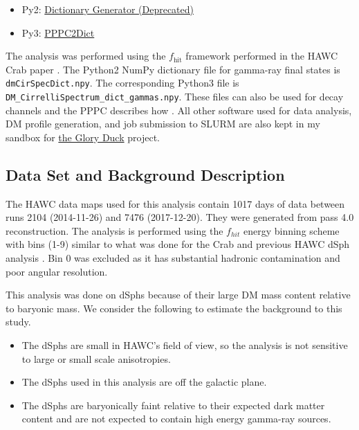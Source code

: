 \begin{itemize}
    \item Py2: \href{https://gitlab.com/hawc-observatory/sandboxes/salaza82/glory-duck-hawc/-/tree/master/GD_spectrum}{Dictionary Generator (Deprecated)}
    \item Py3: \href{https://gitlab.com/hawc-observatory/sandboxes/salaza82/pppc2dict}{PPPC2Dict}
\end{itemize}

The analysis was performed using the $f_{\textrm{hit}}$ framework performed in the HAWC Crab paper \cite{Abeysekara_2017}.
The Python2 NumPy dictionary file for gamma-ray final states is \texttt{dmCirSpecDict.npy}.
The corresponding Python3 file is \texttt{DM\_CirrelliSpectrum\_dict\_gammas.npy}.
These files can also be used for decay channels and the PPPC describes how \cite{Cirelli_2011}.
All other software used for data analysis, DM profile generation, and job submission to SLURM are also kept in my sandbox for \href{https://gitlab.com/hawc-observatory/sandboxes/salaza82/glory-duck-hawc}{the Glory Duck} project.

\subsection{Data Set and Background Description} \label{sec:gs_data_bkgd}

The HAWC data maps used for this analysis contain 1017 days of data between runs 2104 (2014-11-26) and 7476 (2017-12-20).
They were generated from pass 4.0 reconstruction.
The analysis is performed using the $f_{hit}$ energy binning scheme with bins (1-9) similar to what was done for the Crab and previous HAWC dSph analysis \cite{Abeysekara_2017,Albert_2018}.
Bin 0 was excluded as it has substantial hadronic contamination and poor angular resolution.

This analysis was done on dSphs because of their large DM mass content relative to baryonic mass.
We consider the following to estimate the background to this study.

\begin{itemize}
    \item The dSphs are small in HAWC's field of view, so the analysis is not sensitive to large or small scale anisotropies.
    \item The dSphs used in this analysis are off the galactic plane.
    \item The dSphs are baryonically faint relative to their expected dark matter content and are not expected to contain high energy gamma-ray sources.
\end{itemize}

